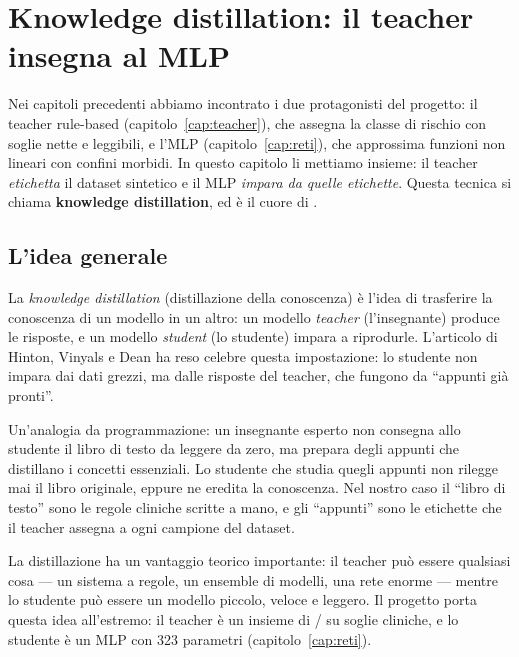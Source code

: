 
\chapter{Knowledge distillation: il teacher insegna al MLP}\label{cap:distillazione}

Nei capitoli precedenti abbiamo incontrato i due protagonisti del progetto: il
teacher rule-based (capitolo~\ref{cap:teacher}), che assegna la classe di
rischio con soglie nette e leggibili, e l'MLP (capitolo~\ref{cap:reti}), che
approssima funzioni non lineari con confini morbidi. In questo capitolo li
mettiamo insieme: il teacher \emph{etichetta} il dataset sintetico e il
MLP \emph{impara da quelle etichette}. Questa tecnica si chiama
\textbf{knowledge distillation}, ed è il cuore di \progetto{}
\cite{knowledge_implic2026}.

\section{L'idea generale}\label{sec:idea-generale}

La \emph{knowledge distillation} (distillazione della conoscenza) è
l'idea di trasferire la conoscenza di un modello in un altro: un modello
\emph{teacher} (l'insegnante) produce le risposte, e un modello
\emph{student} (lo studente) impara a riprodurle. L'articolo di Hinton,
Vinyals e Dean \cite{hinton2015distilling} ha reso celebre questa
impostazione: lo studente non impara dai dati grezzi, ma dalle risposte del
teacher, che fungono da ``appunti già pronti''.

Un'analogia da programmazione: un insegnante esperto non consegna allo
studente il libro di testo da leggere da zero, ma prepara degli appunti che
distillano i concetti essenziali. Lo studente che studia quegli appunti non
rilegge mai il libro originale, eppure ne eredita la conoscenza. Nel nostro
caso il ``libro di testo'' sono le regole cliniche scritte a mano, e gli
``appunti'' sono le etichette che il teacher assegna a ogni campione del
dataset.

La distillazione ha un vantaggio teorico importante: il teacher può essere
qualsiasi cosa — un sistema a regole, un ensemble di modelli, una rete
enorme — mentre lo studente può essere un modello piccolo, veloce e
leggero. Il progetto \progetto{} porta questa idea all'estremo: il teacher
è un insieme di / su soglie cliniche, e lo studente
è un MLP con 323 parametri (capitolo~\ref{cap:reti}).

